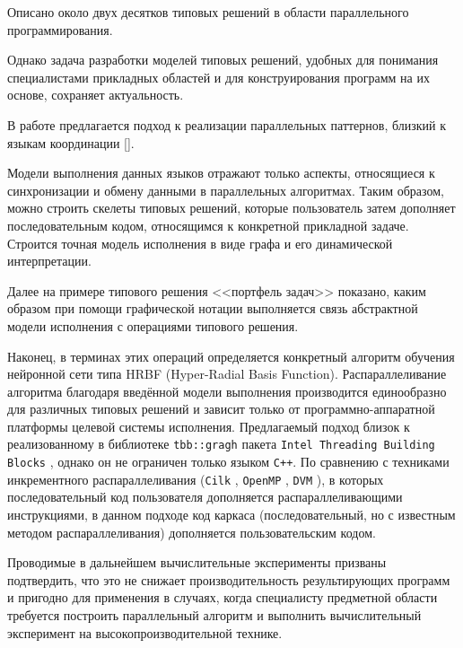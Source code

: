 Описано около двух десятков типовых решений в области параллельного программирования. 

Однако задача разработки моделей типовых решений, удобных для понимания специалистами прикладных областей и для конструирования программ на их основе, сохраняет актуальность.



\smallskip




В работе предлагается подход к реализации параллельных паттернов, близкий к языкам координации []. 

Модели выполнения данных языков отражают только аспекты, относящиеся к синхронизации и обмену данными в параллельных алгоритмах. Таким образом, можно строить скелеты типовых решений, которые пользователь затем дополняет последовательным кодом, относящимся к конкретной прикладной задаче. Строится точная модель исполнения в виде графа и его динамической интерпретации. 

Далее  на примере типового решения <<портфель задач>> \cite{Iosup2008performance} показано, каким образом при помощи графической нотации выполняется связь абстрактной модели исполнения с операциями типового решения. 

Наконец, в терминах этих операций определяется конкретный алгоритм обучения нейронной сети типа HRBF (Hyper-Radial Basis Function). Распараллеливание алгоритма благодаря введённой модели выполнения производится единообразно для различных типовых решений и зависит только от программно-аппаратной платформы целевой системы исполнения. Предлагаемый подход близок к реализованному в библиотеке {\tt tbb::gragh} пакета {\tt Intel Threading Building Blocks} \cite{IntelThreadingBuildingBlocks2007}, однако он не ограничен только языком {\tt C++}. По сравнению с техниками инкрементного распараллеливания ({\tt Cilk} \cite{Blumofe1996cilk}, {\tt OpenMP} \cite{Dagum1998openmp}, {\tt DVM} \cite{Konovalov1994fortran}), в которых последовательный код пользователя дополняется распараллеливающими инструкциями, в данном подходе код каркаса (последовательный, но с известным методом распараллеливания) дополняется пользовательским кодом. 

Проводимые в дальнейшем вычислительные эксперименты призваны подтвердить, что это не снижает производительность результирующих программ и пригодно для применения в случаях, когда специалисту предметной области требуется построить параллельный алгоритм и выполнить вычислительный эксперимент на высокопроизводительной технике.





